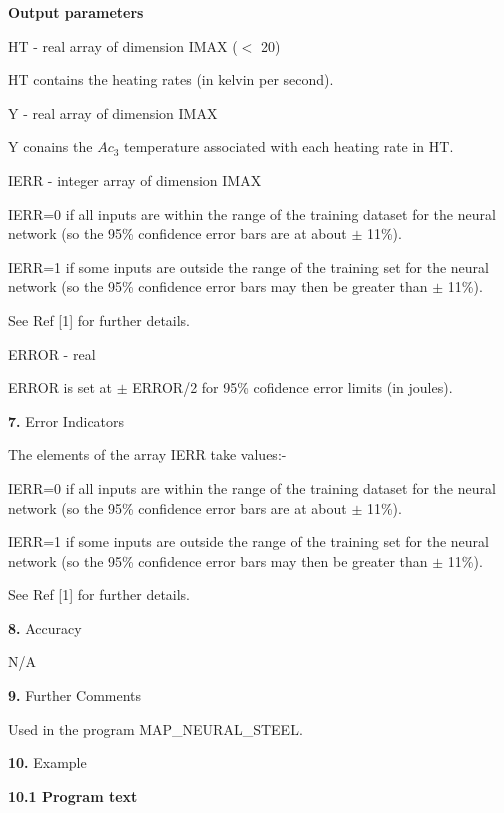 \item {} {\bf Output parameters}
\bigskip
\item {} HT - real array of dimension IMAX ($<$ 20)
\item {} \indent HT contains the heating rates (in kelvin per second).
\medskip
\item {} Y - real array of dimension IMAX
\item {} \indent Y conains the $Ac_3$ temperature associated with each heating
rate in HT.
\medskip
\item {} IERR - integer array of dimension IMAX
\item {} \indent IERR=0 if all inputs are within the range of the training
dataset for the neural network \indent (so the 95\% confidence error bars are at about
$\pm$ 11\%). 
\medskip
\item {} \indent IERR=1 if some inputs are outside the range of the training 
set for the neural network \indent (so the 95\% confidence error bars may then be greater than
$\pm$ 11\%).
\medskip
\item {} \indent See Ref [1] for further details.
\medskip
\item {} ERROR - real
\item {} \indent ERROR is set at $\pm$ ERROR/2 for 95\% cofidence error limits (in joules).
\vfill \eject
\item{\bf 7.} {\largeb  Error Indicators}
\bigskip
\item {} The elements of the array IERR take values:-
\medskip
\item {} IERR=0 if all inputs are within the range of the training
dataset for the neural network \indent (so the 95\% confidence error bars are at about
$\pm$ 11\%). 
\medskip
\item {} IERR=1 if some inputs are outside the range of the training 
set for the neural network \indent (so the 95\% confidence error bars may then be greater than
$\pm$ 11\%).
\medskip
\item {} \indent See Ref [1] for further details.
\item{\bf 8.} {\largeb  Accuracy}
\medskip
\item {} N/A
\item{\bf 9.} {\largeb  Further Comments}
\bigskip
\item {} Used in the program MAP\_NEURAL\_STEEL.
\item{\bf 10.} {\largeb  Example}
\bigskip
\item{} {\bf 10.1 Program text}
\bigskip
